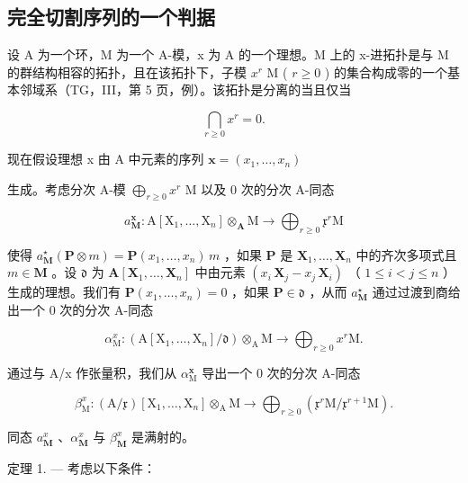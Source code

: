 \subsection{完全切割序列的一个判据}

设 A 为一个环，M 为一个 A-模，x 为 A 的一个理想。M 上的 x-进拓扑是与 M 的群结构相容的拓扑，且在该拓扑下，子模 \(x^{r}\) M ( \(r \geqslant 0\) ) 的集合构成零的一个基本邻域系（TG，III，第 5 页，例）。该拓扑是分离的当且仅当

\[
\bigcap_ {r \geqslant 0} x ^ {r} = 0.
\]

现在假设理想 x 由 A 中元素的序列 \(\boldsymbol{x}=(x_{1},\ldots,x_{n})\)

生成。考虑分次 A-模 \(\bigoplus_{r\geqslant 0}x^{r}\) M 以及 0 次的分次 A-同态

\[
a _ {\mathbf {M}} ^ {\mathbf {x}}: \mathrm{A} [ \mathrm{X} _ {1}, \dots , \mathrm{X} _ {n} ] \otimes_ {\mathbf {A}} \mathrm{M} \rightarrow \bigoplus_ {r \geqslant 0} \mathfrak {x} ^ {r} \mathrm{M}
\]

使得 \(a_{\mathbf{M}}^{\star}(\mathbf{P} \otimes m) = \mathbf{P}(x_1, \ldots, x_n) \, m\) ，如果 \(\mathbf{P}\) 是 \(\mathbf{X}_1, \ldots, \mathbf{X}_n\) 中的齐次多项式且 \(m \in \mathbf{M}\) 。设 \(\mathfrak{d}\) 为 \(\mathbf{A}[\mathbf{X}_1, \ldots, \mathbf{X}_n]\) 中由元素 \((x_i \, \mathbf{X}_j - x_j \, \mathbf{X}_i)\) （ \(1 \leqslant i < j \leqslant n\) ）生成的理想。我们有 \(\mathbf{P}(x_1, \ldots, x_n) = 0\) ，如果 \(\mathbf{P} \in \mathfrak{d}\) ，从而 \(a_{\mathbf{M}}^{\star}\) 通过过渡到商给出一个 0 次的分次 A-同态

\[
\alpha_ {\mathrm{M}} ^ {x}: \left(\mathrm{A} \left[ \mathrm{X} _ {1}, \dots , \mathrm{X} _ {n} \right] / \mathfrak {d}\right) \otimes_ {\mathrm{A}} \mathrm{M} \rightarrow \bigoplus_ {r \geqslant 0} x ^ {r} \mathrm{M}.
\]

通过与 A/x 作张量积，我们从 \(\alpha_{\mathrm{M}}^{\mathbf{x}}\) 导出一个 0 次的分次 A-同态

\[
\beta_ {\mathrm{M}} ^ {x}: (\mathrm{A} / \mathfrak {x}) [ \mathrm{X} _ {1}, \dots , \mathrm{X} _ {n} ] \otimes_ {\mathrm{A}} \mathrm{M} \rightarrow \bigoplus_ {r \geqslant 0} (\mathfrak {x} ^ {r} \mathrm{M} / \mathfrak {x} ^ {r + 1} \mathrm{M}).
\]

同态 \(a_{\mathbf{M}}^{x}\) 、\(\alpha_{\mathbf{M}}^{x}\) 与 \(\beta_{\mathbf{M}}^{x}\) 是满射的。

定理 1. --- 考虑以下条件：


